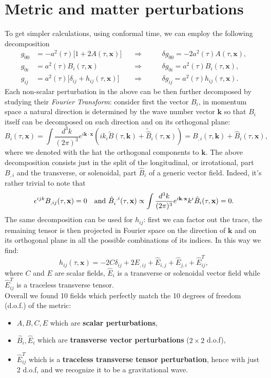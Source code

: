 \section{Metric and matter perturbations}
\label{sec:perturbations}
To get simpler calculations, using conformal time, we can employ the following decomposition
\begin{align}
    g_{00}&=-a^2(\tau)\bigg[1+2A(\tau,\mathbf x)\bigg]\quad&\Rightarrow\qquad&\delta g_{00}=-2a^2(\tau)A(\tau,\mathbf x),\\
    g_{0i}&=a^2(\tau)B_i(\tau,\mathbf x)\quad&\Rightarrow\qquad&\delta g_{0i}=a^2(\tau)B_i(\tau,\mathbf x),\\
    g_{ij}&=a^2(\tau)\bigg[\delta_{ij}+h_{ij}(\tau,\mathbf x)\bigg]\quad&\Rightarrow\qquad&\delta g_{ij}=a^2(\tau)h_{ij}(\tau,\mathbf x).
\end{align} 
Each non-scalar perturbation in the above can be then further decomposed by studying their \emph{Fourier Transform}: consider first the vector $B_i$, in momentum space a natural direction is determined by the wave number vector $\mathbf k$ so that $B_i$ itself can be decomposed on such direction and on its orthogonal plane: $$B_i(\tau,\mathbf x)=\int\frac{d^3k}{(2\pi)^3}e^{i\mathbf{k\cdot x}}(ik_i\tilde B(\tau,\mathbf k)+\tilde{\hat{B}}_i(\tau,\mathbf x))=B_{,i}(\tau,\mathbf k)+\hat{B}_i(\tau,\mathbf x),$$ where we denoted with the hat the orthogonal components to $\mathbf{k}$. The above decomposition consists just in the split of the longitudinal, or irrotational, part $B_{,i}$ and the transverse, or solenoidal, part $\hat{ B}_i$ of a generic vector field. Indeed, it's rather trivial to note that $$\epsilon^{ijk}B_{,ij}(\tau,\mathbf x)=0\quad\text{and } \tensor{\hat B}{_{i}^{,i}}(\tau,\mathbf x)\propto\int\frac{d^3k}{(2\pi)^3}e^{i\mathbf{k\cdot x}}k^i\hat{B}_i(\tau,\mathbf x)=0.$$
The same decomposition can be used for $h_{ij}$: first we can factor out the trace, the remaining tensor is then projected in Fourier space on the direction of $\mathbf{k}$ and on its orthogonal plane in all the possible combinations of its indices. In this way we find:
$$h_{ij}(\tau,\mathbf x)=-2C\delta_{ij}+2E_{,ij}+\hat E_{i,j}+\hat E_{j,i}+\hat E^{T}_{ij},$$ where $C$ and $E$ are scalar fields, $\hat E_i$ is a transverse or solenoidal vector field while $\hat E^{T}_{ij}$ is a traceless transverse tensor.\\ Overall we found 10 fields which perfectly match the 10 degrees of freedom (d.o.f.) of the metric:
\begin{itemize}
    \item $A,B,C,E$ which are \textbf{scalar perturbations},
    \item $\hat B_i,\hat E_i$ which are \textbf{transverse vector perturbations} ($2\times2$ d.o.f),
    \item $\hat E^T_{ij}$ which is a \textbf{traceless transverse tensor perturbation}, hence with just 2 d.o.f, and we recognize it to be a gravitational wave.
\end{itemize}

